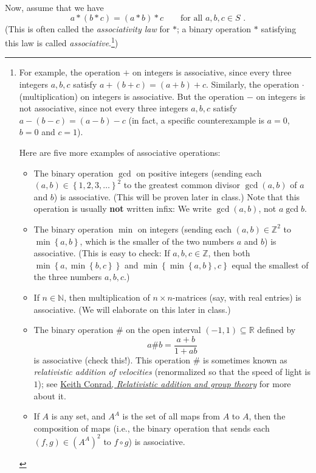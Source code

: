 \documentclass[paper=a4, fontsize=12pt]{scrartcl} %
\newcommand{\RR}{\mathbb{R}} %
\newcommand{\NN}{\mathbb{N}} %
\newcommand{\ZZ}{\mathbb{Z}} %
\newcommand{\set}[1]{\left\{ #1 \right\}}
\newcommand{\tup}[1]{\left( #1 \right)}
\theoremstyle{plainsl}
\theoremstyle{definition}
\theoremstyle{remark}
\begin{document}
Now, assume that we have
\begin{equation}
a * \tup{b * c} = \tup{a * b} * c
\qquad \text{for all $a, b, c \in S$ .}
\label{eq.exe.gen-ass.ass}
\end{equation}
(This is often called the \textit{associativity law} for $*$;
a binary operation $*$ satisfying this law is called
\textit{associative}.\footnote{For
example, the operation $+$ on integers is associative, since
every three integers $a, b, c$ satisfy
$a + \tup{b + c} = \tup{a + b} + c$.
Similarly, the operation $\cdot$ (multiplication) on integers
is associative.
But the operation $-$ on integers is not associative, since
not every three integers $a, b, c$ satisfy
$a - \tup{b - c} = \tup{a - b} - c$
(in fact, a specific counterexample is $a = 0$, $b = 0$ and
$c = 1$).

Here are five more examples of associative operations:

\begin{itemize}

\item The binary operation $\gcd$ on positive integers
      (sending each $\tup{a, b} \in \set{1,2,3,\ldots}^2$
      to the greatest common divisor $\gcd\tup{a, b}$
      of $a$ and $b$) is associative.
      (This will be proven later in class.)
      Note that this operation is usually \textbf{not}
      written infix: We write $\gcd\tup{a, b}$, not
      $a \gcd b$.

\item The binary operation $\min$ on integers
      (sending each $\tup{a, b} \in \ZZ^2$ to
      $\min\set{a, b}$, which is the smaller of the two
      numbers $a$ and $b$) is associative.
      (This is easy to check: If $a, b, c \in \ZZ$,
      then both $\min\set{a, \min\set{b, c}}$ and
      $\min\set{\min\set{a, b}, c}$ equal the smallest
      of the three numbers $a, b, c$.)
      
\item If $n \in \NN$, then
      multiplication of $n \times n$-matrices
      (say, with real entries)
      is associative.
      (We will elaborate on this later in class.)

\item The binary operation $\#$ on the open interval
      $\tup{-1, 1} \subseteq \RR$ defined by
      \[
      a \# b = \dfrac{a + b}{1 + ab}
      \]
      is associative (check this!).
      This operation $\#$ is sometimes known as
      \textit{relativistic addition of velocities} (renormalized
      so that the speed of light is $1$);
      see
      \href{https://kconrad.math.uconn.edu/blurbs/grouptheory/relativity.pdf}{Keith Conrad, \textit{Relativistic addition and group theory}}
      for more about it.

\item If $A$ is any set, and $A^A$ is the set of all
      maps from $A$ to $A$, then the composition of
      maps (i.e., the binary operation that sends
      each $\tup{f, g} \in \tup{A^A}^2$ to
      $f \circ g$) is associative.
\end{itemize}
})
\end{document}
